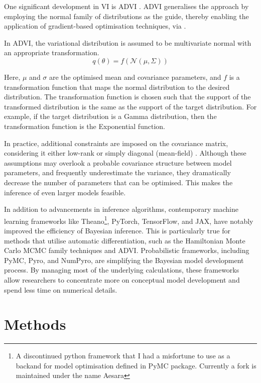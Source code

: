 One significant development in \ac{VI} is \ac{ADVI} \citep{Kucukelbir2016-gn}. \ac{ADVI} generalises the approach by employing the normal family of distributions as the guide, thereby enabling the application of gradient-based optimisation techniques, via .

In \ac{ADVI}, the variational distribution is assumed to be multivariate normal with an appropriate transformation.
\begin{equation}
q(\theta) = f(\mathcal{N}(\mu, \Sigma))
\end{equation}

Here, $\mu$ and $\sigma$ are the optimised mean and covariance parameters, and $f$ is a transformation function that maps the normal distribution to the desired distribution. The transformation function is chosen such that the support of the transformed distribution is the same as the support of the target distribution. For example, if the target distribution is a Gamma distribution, then the transformation function is the Exponential function. 

In practice, additional constraints are imposed on the covariance matrix, considering it either low-rank or simply diagonal (mean-field) \citep{Blei2017-dm}. Although these assumptions may overlook a probable covariance structure between model parameters, and frequently underestimate the variance, they dramatically decrease the number of parameters that can be optimised. This makes the inference of even larger models feasible.

In addition to advancements in inference algorithms, contemporary machine learning frameworks like \ac{Theano}\footnote{A discontinued python framework that I had a misfortune to use as a backand for model optimisation defined in PyMC package. Currently a fork is maintained under the name Aesara}, \ac{PyTorch}, \ac{TensorFlow}, and \ac{JAX}, have notably improved the efficiency of Bayesian inference. This is particularly true for methods that utilise automatic differentiation, such as the Hamiltonian Monte Carlo \ac{MCMC} family techniques and \ac{ADVI}. Probabilistic frameworks, including \ac{PyMC}, \ac{Pyro}, and \ac{NumPyro}, are simplifying the Bayesian model development process. By managing most of the underlying calculations, these frameworks allow researchers to concentrate more on conceptual model development and spend less time on numerical details.

\section{Methods}


